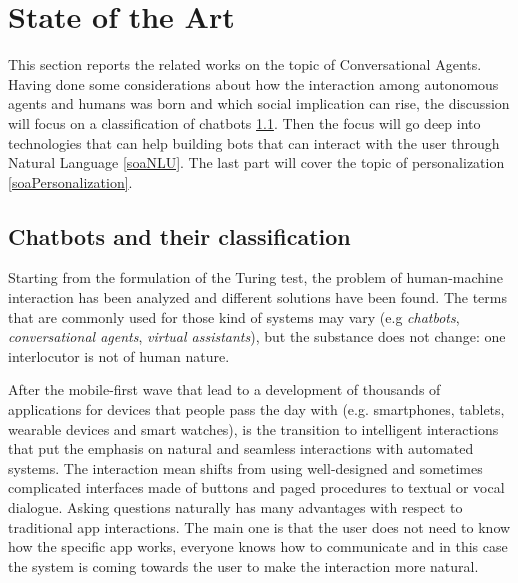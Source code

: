 


\chapter{State of the Art}
\label{soa}

This section reports the related works on the topic of Conversational Agents. Having done some considerations about how the interaction among autonomous agents and humans was born and which social implication can rise, the discussion will focus on a classification of chatbots \ref{soaClassification}. Then the focus will go deep into technologies that can help building bots that can interact with the user through Natural Language \ref{soaNLU}. The last part will cover the topic of personalization \ref{soaPersonalization}.

\section{Chatbots and their classification}
\label{soaClassification}

Starting from the formulation of the Turing test, the problem of human-machine interaction has been analyzed and different solutions have been found. The terms that are commonly used for those kind of systems may vary (e.g \textit{chatbots}, \textit{conversational agents}, \textit{virtual assistants}), but the substance does not change: one interlocutor is not of human nature.

After the mobile-first wave that lead to a development of thousands of applications for devices that people pass the day with (e.g. smartphones, tablets, wearable devices and smart watches), is the transition to intelligent interactions that put the emphasis on natural and seamless interactions with automated systems. The interaction mean shifts from using well-designed and sometimes complicated interfaces made of buttons and paged procedures to textual or vocal dialogue. Asking questions naturally has many advantages with respect to traditional app interactions. The main one is that the user does not need to know how the specific app works, everyone knows how to communicate and in this case the system is coming towards the user to make the interaction more natural.

